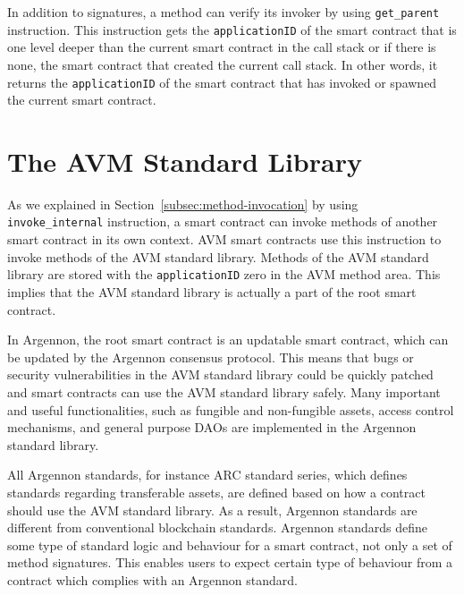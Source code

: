 
In addition to signatures, a method can verify its invoker by using \texttt{get\_parent} instruction. This
instruction gets the \texttt{applicationID} of the smart contract that is one level deeper than the current
smart contract in the call stack or if there is none, the smart contract that created the current call stack.
In other words, it returns the \texttt{applicationID} of the smart contract that has invoked or spawned
the current smart contract.


\section{The AVM Standard Library}\label{sec:the-avm-standard-library}

As we explained in Section~\ref{subsec:method-invocation} by using \texttt{invoke\_internal} instruction, a smart
contract can invoke methods of another smart contract in its own context. AVM smart contracts use this instruction to
invoke methods of the AVM standard library. Methods of the AVM standard library are stored
with the \texttt{applicationID} zero in the AVM method area. This implies that the AVM standard library is actually
a part of the root smart contract.

In Argennon, the root smart contract is an updatable smart contract, which can be updated by the Argennon consensus
protocol. This means that bugs or security vulnerabilities in the AVM standard library could be quickly patched and
smart contracts can use the AVM standard library safely. Many important and useful functionalities,
such as fungible and non-fungible assets, access control mechanisms,
and general purpose DAOs are implemented in the Argennon standard library.

All Argennon standards, for instance ARC standard series, which defines standards regarding transferable assets,
are defined based on how a contract should use the AVM standard library. As a result, Argennon standards are
different from conventional blockchain standards. Argennon standards define some type of standard logic and
behaviour for a smart contract, not only a set of method signatures. This enables users to expect certain type
of behaviour from a contract which complies with an Argennon standard.
